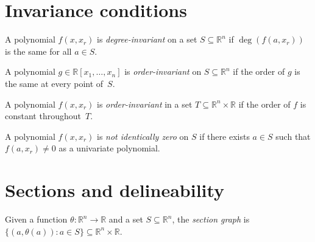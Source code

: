 \section{Invariance conditions}

\begin{definition}
  \label{def:DegreeInvariant}
  \leanok
  A polynomial $f(x, x_r)$ is \emph{degree-invariant} on a set
  $S \subseteq \mathbb{R}^n$ if $\deg(f(a, x_r))$ is the same for all $a \in S$.
\end{definition}

\begin{definition}
  \label{def:OrderInvariantMv}
  \leanok
  A polynomial $g \in \mathbb{R}[x_1,\ldots,x_n]$ is \emph{order-invariant} on
  $S \subseteq \mathbb{R}^n$ if the order of $g$ is the same at every point of~$S$.
\end{definition}

\begin{definition}
  \label{def:OrderInvariantFull}
  \leanok
  A polynomial $f(x, x_r)$ is \emph{order-invariant} in a set
  $T \subseteq \mathbb{R}^n \times \mathbb{R}$ if the order of $f$ is constant
  throughout~$T$.
\end{definition}

\begin{definition}
  \label{def:NotIdenticallyZeroOn}
  \leanok
  A polynomial $f(x, x_r)$ is \emph{not identically zero} on $S$ if there exists
  $a \in S$ such that $f(a, x_r) \neq 0$ as a univariate polynomial.
\end{definition}

\section{Sections and delineability}

\begin{definition}
  \label{def:SectionGraph}
  \leanok
  Given a function $\theta \colon \mathbb{R}^n \to \mathbb{R}$ and a set
  $S \subseteq \mathbb{R}^n$, the \emph{section graph} is
  $\{ (a, \theta(a)) : a \in S \} \subseteq \mathbb{R}^n \times \mathbb{R}$.
\end{definition}

